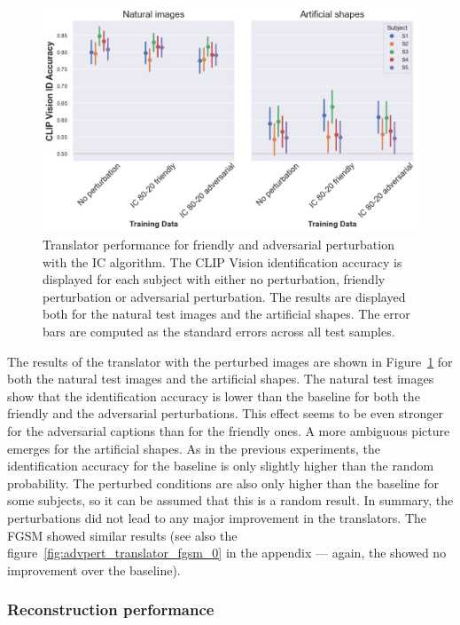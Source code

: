 \begin{figure}[ht]
    \centering
    \includegraphics[width=1\textwidth]{plots/advpert_translator_ic_80-20.png}
    \caption[Experiment 3: Translator performance]{Translator performance for friendly and adversarial perturbation with the IC algorithm. The CLIP Vision identification accuracy is displayed for each subject with either no perturbation, friendly perturbation or adversarial perturbation. The results are displayed both for the natural test images and the artificial shapes. The error bars are computed as the standard errors across all test samples.}\label{fig:advpert_translator_ic_80}
\end{figure}

The results of the translator with the perturbed images are shown in Figure~\ref{fig:advpert_translator_ic_80} for both the natural test images and the artificial shapes. The natural test images show that the identification accuracy is lower than the baseline for both the friendly and the adversarial perturbations. This effect seems to be even stronger for the adversarial captions than for the friendly ones. A more ambiguous picture emerges for the artificial shapes. As in the previous experiments, the identification accuracy for the baseline is only slightly higher than the random probability. The perturbed conditions are also only higher than the baseline for some subjects, so it can be assumed that this is a random result. In summary, the perturbations did not lead to any major improvement in the translators. The FGSM showed similar results (see also the figure~\ref{fig:advpert_translator_fgsm_0} in the appendix --- again, the  showed no improvement over the baseline). 


\subsubsection{Reconstruction performance}

